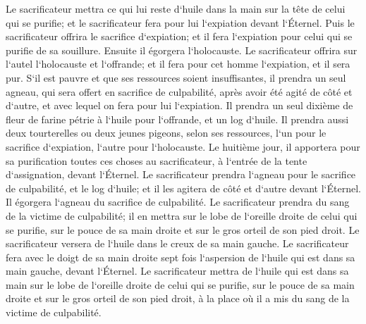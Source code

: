 \verse Le sacrificateur mettra ce qui lui reste d`huile dans la main sur la tête de celui qui se purifie; et le sacrificateur fera pour lui l`expiation devant l`Éternel. 
\verse Puis le sacrificateur offrira le sacrifice d`expiation; et il fera l`expiation pour celui qui se purifie de sa souillure. 
\verse Ensuite il égorgera l`holocauste. Le sacrificateur offrira sur l`autel l`holocauste et l`offrande; et il fera pour cet homme l`expiation, et il sera pur. 
\verse S`il est pauvre et que ses ressources soient insuffisantes, il prendra un seul agneau, qui sera offert en sacrifice de culpabilité, après avoir été agité de côté et d`autre, et avec lequel on fera pour lui l`expiation. Il prendra un seul dixième de fleur de farine pétrie à l`huile pour l`offrande, et un log d`huile. 
\verse Il prendra aussi deux tourterelles ou deux jeunes pigeons, selon ses ressources, l`un pour le sacrifice d`expiation, l`autre pour l`holocauste. 
\verse Le huitième jour, il apportera pour sa purification toutes ces choses au sacrificateur, à l`entrée de la tente d`assignation, devant l`Éternel. 
\verse Le sacrificateur prendra l`agneau pour le sacrifice de culpabilité, et le log d`huile; et il les agitera de côté et d`autre devant l`Éternel. 
\verse Il égorgera l`agneau du sacrifice de culpabilité. Le sacrificateur prendra du sang de la victime de culpabilité; il en mettra sur le lobe de l`oreille droite de celui qui se purifie, sur le pouce de sa main droite et sur le gros orteil de son pied droit. 
\verse Le sacrificateur versera de l`huile dans le creux de sa main gauche. 
\verse Le sacrificateur fera avec le doigt de sa main droite sept fois l`aspersion de l`huile qui est dans sa main gauche, devant l`Éternel. 
\verse Le sacrificateur mettra de l`huile qui est dans sa main sur le lobe de l`oreille droite de celui qui se purifie, sur le pouce de sa main droite et sur le gros orteil de son pied droit, à la place où il a mis du sang de la victime de culpabilité. 
